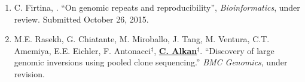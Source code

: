
\begin{enumerate}
\item 
C. Firtina, \calkan{}. ``On genomic repeats and reproducibility'',
{\em Bioinformatics}, under review. Submitted October 26, 2015.
\item 
  M.E. Rasekh, G. Chiatante, M. Miroballo, J. Tang, M. Ventura, C.T. Amemiya, E.E. Eichler, F. Antonacci$^\ddag$, {\bf {\underline{C. Alkan}}}$^\ddag$.
  ``Discovery of large genomic inversions using pooled clone sequencing.''
  {\em BMC Genomics}, under revision.
\end{enumerate}
